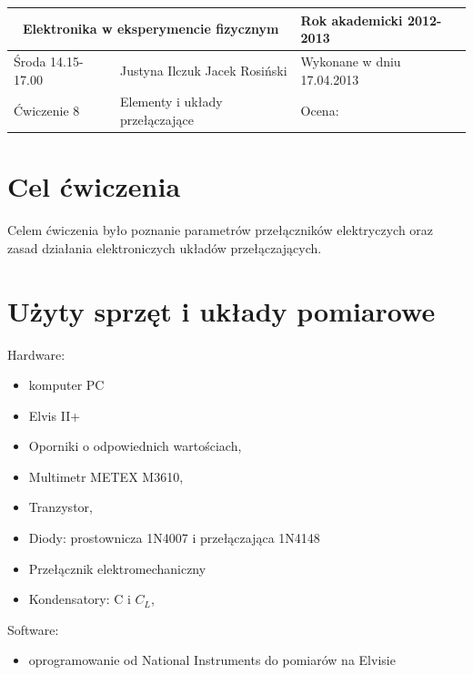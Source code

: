 \documentclass[a4paper,11pt]{article}
\author{Justyna Ilczuk, Jacek Rosiński}
\begin{document}
\begin{center}

    \begin{tabular}{ | m{5cm}| m{5cm} | m{5cm} |}
    \hline 
    \multicolumn{2}{|c|}{Elektronika w eksperymencie fizycznym}
    & Rok akademicki 2012-2013 \\ 
    
    \hline
    Środa 14.15-17.00 
    & Justyna Ilczuk \newline Jacek Rosiński
    & Wykonane w dniu 17.04.2013 \\
   	
   	\hline
   	Ćwiczenie 8 & Elementy i układy przełączające &    Ocena: \\
   	\hline
    \end{tabular}
\end{center}

\pagestyle{fancy}
\fancyfoot[CO]{\ }
\fancyhead[RO]{\footnotesize{\thepage} }




\section{Cel ćwiczenia}
Celem ćwiczenia było poznanie parametrów przełączników elektryczych oraz zasad działania elektroniczych układów przełączających.

\section{Użyty sprzęt i układy pomiarowe}

Hardware:
\begin{itemize}
\item komputer PC
\item Elvis II+
\item Oporniki o odpowiednich wartościach,
\item Multimetr METEX M3610,
\item Tranzystor,
\item Diody: prostownicza 1N4007 i przełączająca 1N4148
\item Przełącznik elektromechaniczny
\item Kondensatory: C i \(C_L\), 

\end{itemize}

Software:
\begin{itemize}
\item oprogramowanie od National Instruments do pomiarów na Elvisie

\end{itemize}
\end{document}
